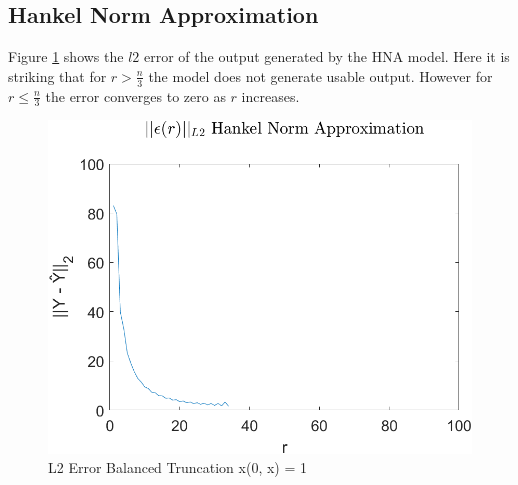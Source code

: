 \subsection{Hankel Norm Approximation}
Figure \ref{FIG-ERR-HNA} shows the \(l2\) error of the output generated by the HNA model.
Here it is striking that for \(r > \frac{n}{3}\) the model does not generate usable output.
However for \(r \leq \frac{n}{3}\) the error converges to zero as \(r\) increases.
\begin{figure}[H]
\centering
\includegraphics[width=12.5cm]{images/L2_HNA}
\caption{L2 Error Balanced Truncation x(0, x) = 1}
\label{FIG-ERR-HNA}
\end{figure}


